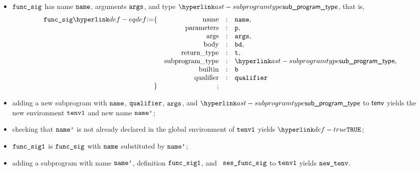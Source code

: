 \ProseParagraph
\AllApply
\begin{itemize}
  \item $\texttt{func\_sig}$ has name $\texttt{name}$, arguments $\texttt{args}$, and type $\subprogramtype$, that is,
  \[
    \begin{array}{rrcl}
      \funcsig \eqdef \{
                      & \funcname            &:& \name,\\
                      & \funcparameters      &:& \vp,\\
                      & \funcargs            &:& \vargs,\\
                      & \funcbody            &:& \bd,\\
                      & \funcreturntype      &:& \vt,\\
                      & \funcsubprogramtype  &:& \subprogramtype, \\
                      & \funcbuiltin         &:& \vb \\
                      & \funcqualifier       &:& \vqualifier \\
                  \}  & ; &&
        \end{array}
  \]
  \item adding a new subprogram with $\texttt{name}$, $\texttt{qualifier}$, $\texttt{args}$, and $\subprogramtype$ to $\textsf{tenv}$ yields the new
        environment $\texttt{tenv1}$ and new name $\texttt{name'}$\ProseOrTypeError;
  \item checking that $\texttt{name'}$ is not already declared in the global environment of $\texttt{tenv1}$
        yields $\True$\ProseOrTypeError;
  \item $\texttt{func\_sig1}$ is $\texttt{func\_sig}$ with $\texttt{name}$ substituted by $\texttt{name'}$;
  \item adding a subprogram with name $\texttt{name'}$, definition $\texttt{func\_sig1}$,
        and \sideeffectsetterm\ $\texttt{ses\_func\_sig}$ to $\texttt{tenv1}$ yields $\texttt{new\_tenv}$\ProseOrTypeError.
\end{itemize}

